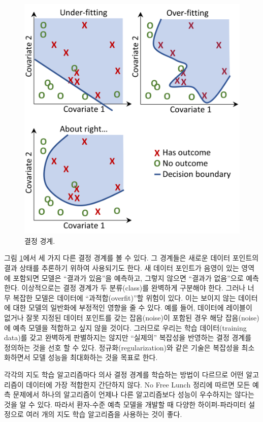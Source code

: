 \documentclass[10.5pt]{book}
\theoremstyle{definition}
\theoremstyle{definition}
\theoremstyle{definition}
\theoremstyle{remark}
\begin{document}
\begin{figure}

{\centering \includegraphics[width=0.8\linewidth]{images/PatientLevelPrediction/decisionBoundary} 

}

\caption{결정 경계.}\label{fig:decisionBoundary}
\end{figure}

그림 \ref{fig:decisionBoundary}에서 세 가지 다른 결정 경계를 볼 수 있다.
그 경계들은 새로운 데이터 포인트의 결과 상태를 추론하기 위하여
사용되기도 한다. 새 데이터 포인트가 음영이 있는 영역에 포함되면 모델은
``결과가 있음''을 예측하고, 그렇지 않으면 ``결과가 없음''으로 예측한다.
이상적으로는 결정 경계가 두 분류(class)를 완벽하게 구분해야 한다. 그러나
너무 복잡한 모델은 데이터에 ``과적합(overfit)''할 위험이 있다. 이는
보이지 않는 데이터에 대한 모델의 일반화에 부정적인 영향을 줄 수 있다.
예를 들어, 데이터에 레이블이 없거나 잘못 지정된 데이터 포인트를 갖는
잡음(noise)이 포함된 경우 해당 잡음(noise)에 예측 모델을 적합하고 싶지
않을 것이다. 그러므로 우리는 학습 데이터(training data)를 갖고 완벽하게
판별하지는 않지만 ``실제의'' 복잡성을 반영하는 결정 경계를 정의하는 것을
선호 할 수 있다. 정규화(regularization)와 같은 기술은 복잡성을
최소화하면서 모델 성능을 최대화하는 것을 목표로 한다.

각각의 지도 학습 알고리즘마다 의사 결정 경계를 학습하는 방법이 다르므로
어떤 알고리즘이 데이터에 가장 적합한지 간단하지 않다. No Free Lunch
정리에 따르면 모든 예측 문제에서 하나의 알고리즘이 언제나 다른
알고리즘보다 성능이 우수하지는 않다는 것을 알 수
있다. 따라서 환자-수준 예측 모델을 개발할 때 다양한
하이퍼-파라미터 설정으로 여러 개의 지도 학습 알고리즘을 사용하는 것이
좋다.
\end{document}
